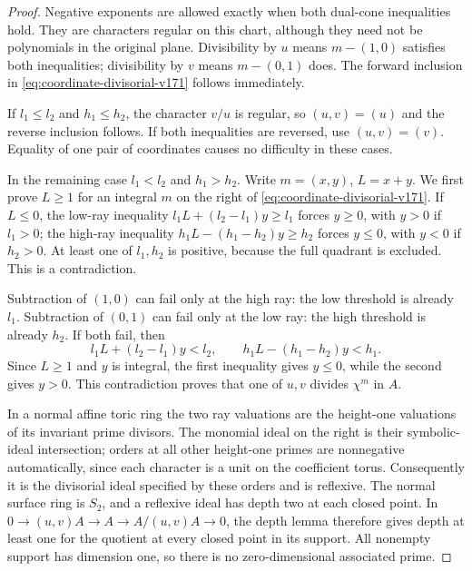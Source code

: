 \documentclass[11pt,reqno]{amsart}
\numberwithin{equation}{section}
\theoremstyle{definition}\newtheorem{definition}[theorem]{Definition}
\theoremstyle{remark}\newtheorem{remark}[theorem]{Remark}
\begin{document}
\begin{proof}
Negative exponents are allowed exactly when both dual-cone
inequalities hold. They are characters regular on this chart,
although they need not be polynomials in the original plane. Divisibility
by $u$ means $m-(1,0)$ satisfies both inequalities; divisibility by
$v$ means $m-(0,1)$ does. The forward inclusion in
\eqref{eq:coordinate-divisorial-v171} follows immediately.

If $l_1\leq l_2$ and $h_1\leq h_2$, the character $v/u$ is regular,
so $(u,v)=(u)$ and the reverse inclusion follows. If both inequalities
are reversed, use $(u,v)=(v)$. Equality of one pair of coordinates
causes no difficulty in these cases.

In the remaining case $l_1<l_2$ and $h_1>h_2$. Write $m=(x,y)$,
$L=x+y$. We first prove $L\geq1$ for an integral $m$ on the right
of \eqref{eq:coordinate-divisorial-v171}. If $L\leq0$, the low-ray
inequality
$l_1L+(l_2-l_1)y\geq l_1$ forces $y\geq0$, with $y>0$ if $l_1>0$;
the high-ray inequality
$h_1L-(h_1-h_2)y\geq h_2$ forces $y\leq0$, with $y<0$ if $h_2>0$.
At least one of $l_1,h_2$ is positive, because the full quadrant is
excluded. This is a contradiction.

Subtraction of $(1,0)$ can fail only at the high ray: the low
threshold is already $l_1$. Subtraction of $(0,1)$ can fail only
at the low ray: the high threshold is already $h_2$. If both fail,
then
\[
 l_1L+(l_2-l_1)y<l_2,
 \qquad h_1L-(h_1-h_2)y<h_1.
\]
Since $L\geq1$ and $y$ is integral, the first inequality gives
$y\leq0$, while the second gives $y>0$. This contradiction proves
that one of $u,v$ divides $\chi^m$ in $A$.

In a normal affine toric ring the two ray valuations are the
height-one valuations of its invariant prime divisors. The monomial
ideal on the right is their symbolic-ideal intersection; orders at
all other height-one primes are nonnegative automatically, since
each character is a unit on the coefficient torus. Consequently it
is the divisorial ideal specified by these orders and is reflexive.
The normal surface ring is $S_2$, and a reflexive ideal has depth
two at each closed point. In
$0\to (u,v)A\to A\to A/(u,v)A\to0$, the depth lemma therefore gives
depth at least one for the quotient at every closed point in its
support. All nonempty support has dimension one, so there is no
zero-dimensional associated prime.
\end{proof}
\end{document}
